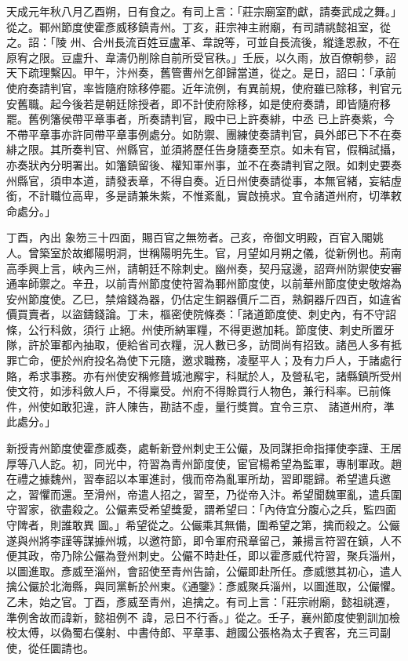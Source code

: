 
\begin{pinyinscope}

 天成元年秋八月乙酉朔，日有食之。有司上言：「莊宗廟室酌獻，請奏武成之舞。」從之。鄆州節度使霍彥威移鎮青州。丁亥，莊宗神主祔廟，有司請祧懿祖室，從之。詔：「陵
 州、合州長流百姓豆盧革、韋說等，可並自長流後，縱逢恩赦，不在原宥之限。豆盧升、韋濤仍削除自前所受官秩。」壬辰，以久雨，放百僚朝參，詔天下疏理繫囚。甲午，汴州奏，舊管曹州乞卻歸當道，從之。是日，詔曰：「承前使府奏請判官，率皆隨府除移停罷。近年流例，有異前規，使府雖已除移，判官元安舊職。起今後若是朝廷除授者，即不計使府除移，如是使府奏請，即皆隨府移罷。舊例籓侯帶平章事者，所奏請判官，殿中已上許奏緋，中丞
 已上許奏紫，今不帶平章事亦許同帶平章事例處分。如防禦、團練使奏請判官，員外郎已下不在奏緋之限。其所奏判官、州縣官，並須將歷任告身隨奏至京。如未有官，假稱試攝，亦奏狀內分明署出。如籓鎮留後、權知軍州事，並不在奏請判官之限。如刺史要奏州縣官，須申本道，請發表章，不得自奏。近日州使奏請從事，本無官緒，妄結虛銜，不計職位高卑，多是請兼朱紫，不惟紊亂，實啟撓求。宜令諸道州府，切準敕命處分。」


丁酉，內出
 象笏三十四面，賜百官之無笏者。己亥，帝御文明殿，百官入閣姚
 人。曾築室於故鄉陽明洞，世稱陽明先生。官，月望如月朔之儀，從新例也。荊南高季興上言，峽內三州，請朝廷不除刺史。幽州奏，契丹寇邊，詔齊州防禦使安審通率師禦之。辛丑，以前青州節度使符習為鄆州節度使，以前華州節度使史敬熔為安州節度使。乙巳，禁熔錢為器，仍估定生銅器價斤二百，熟銅器斤四百，如違省價買賣者，以盜鑄錢論。丁未，樞密使院條奏：「諸道節度使、刺史內，有不守詔條，公行科斂，須行
 止絕。州使所納軍糧，不得更邀加耗。節度使、刺史所置牙隊，許於軍都內抽取，便給省司衣糧，況人數已多，訪問尚有招致。諸邑人多有抵罪亡命，便於州府投名為使下元隨，邀求職務，凌壓平人；及有力戶人，于諸處行賂，希求事務。亦有州使安稱修葺城池廨宇，科賦於人，及營私宅，諸縣鎮所受州使文符，如涉科斂人戶，不得稟受。州府不得賒買行人物色，兼行科率。已前條件，州使如敢犯違，許人陳告，勘詰不虛，量行獎賞。宜令三京、
 諸道州府，準此處分。」



 新授青州節度使霍彥威奏，處斬新登州刺史王公儼，及同謀拒命指揮使李謹、王居厚等八人訖。初，同光中，符習為青州節度使，宦官楊希望為監軍，專制軍政。趙在禮之據魏州，習奉詔以本軍進討，俄而帝為亂軍所劫，習即罷歸。希望遣兵邀之，習懼而還。至滑州，帝遣人招之，習至，乃從帝入汴。希望聞魏軍亂，遣兵圍守習家，欲盡殺之。公儼素受希望獎愛，謂希望曰：「內侍宜分腹心之兵，監四面守陴者，則誰敢異
 圖。」希望從之。公儼乘其無備，圍希望之第，擒而殺之。公儼遂與州將李謹等謀據州城，以邀符節，即令軍府飛章留己，兼揚言符習在鎮，人不便其政，帝乃除公儼為登州刺史。公儼不時赴任，即以霍彥威代符習，聚兵淄州，以圖進取。彥威至淄州，會詔使至青州告諭，公儼即赴所任。彥威懲其初心，遣人擒公儼於北海縣，與同黨斬於州東。《通鑒》：彥威聚兵淄州，以圖進取，公儼懼。乙未，始之官。丁酉，彥威至青州，追擒之。有司上言：「莊宗祔廟，懿祖祧遷，準例舍故而諱新，懿祖例不
 諱，忌日不行香。」從之。壬子，襄州節度使劉訓加檢校太傅，以偽蜀右僕射、中書侍郎、平章事、趙國公張格為太子賓客，充三司副使，從任圜請也。



\end{pinyinscope}
